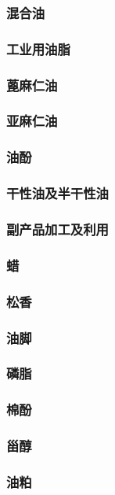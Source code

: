 \documentclass[UTF8]{../../ApplicationUniverse}
\begin{document}
        \subsubsection{混合油}
    \subsubsection{工业用油脂}
        \subsubsection{蓖麻仁油}
        \subsubsection{亚麻仁油}
        \subsubsection{油酚}
        \subsubsection{干性油及半干性油}
    \subsubsection{副产品加工及利用}
        \subsubsection{蜡}
        \subsubsection{松香}
        \subsubsection{油脚}
        \subsubsection{磷脂}
        \subsubsection{棉酚}
        \subsubsection{甾醇}
        \subsubsection{油粕}
\end{document}
